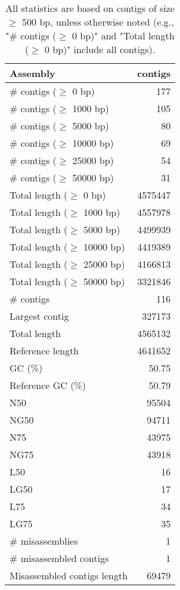 \documentclass[12pt,a4paper]{article}
\begin{document}
\begin{table}[ht]
\begin{center}
\caption{All statistics are based on contigs of size $\geq$ 500 bp, unless otherwise noted (e.g., "\# contigs ($\geq$ 0 bp)" and "Total length ($\geq$ 0 bp)" include all contigs).}
\begin{tabular}{|l*{1}{|r}|}
\hline
Assembly & contigs \\ \hline
\# contigs ($\geq$ 0 bp) & 177 \\ \hline
\# contigs ($\geq$ 1000 bp) & 105 \\ \hline
\# contigs ($\geq$ 5000 bp) & 80 \\ \hline
\# contigs ($\geq$ 10000 bp) & 69 \\ \hline
\# contigs ($\geq$ 25000 bp) & 54 \\ \hline
\# contigs ($\geq$ 50000 bp) & 31 \\ \hline
Total length ($\geq$ 0 bp) & 4575447 \\ \hline
Total length ($\geq$ 1000 bp) & 4557978 \\ \hline
Total length ($\geq$ 5000 bp) & 4499939 \\ \hline
Total length ($\geq$ 10000 bp) & 4419389 \\ \hline
Total length ($\geq$ 25000 bp) & 4166813 \\ \hline
Total length ($\geq$ 50000 bp) & 3321846 \\ \hline
\# contigs & 116 \\ \hline
Largest contig & 327173 \\ \hline
Total length & 4565132 \\ \hline
Reference length & 4641652 \\ \hline
GC (\%) & 50.75 \\ \hline
Reference GC (\%) & 50.79 \\ \hline
N50 & 95504 \\ \hline
NG50 & 94711 \\ \hline
N75 & 43975 \\ \hline
NG75 & 43918 \\ \hline
L50 & 16 \\ \hline
LG50 & 17 \\ \hline
L75 & 34 \\ \hline
LG75 & 35 \\ \hline
\# misassemblies & 1 \\ \hline
\# misassembled contigs & 1 \\ \hline
Misassembled contigs length & 69479 \\ \hline

\end{tabular}
\end{center}
\end{table}
\end{document}
